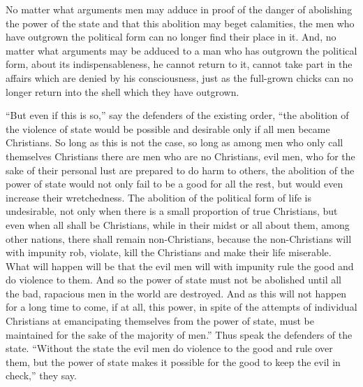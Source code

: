 \documentclass{book}
\begin{document}
No matter what arguments men may adduce in proof of the danger of abolishing the power of the state and that this abolition may beget calamities, the men who have outgrown the political form can no longer find their place in it. And, no matter what arguments may be adduced to a man who has outgrown the political form, about its indispensableness, he cannot return to it, cannot take part in the affairs which are denied by his consciousness, just as the full-grown chicks can no longer return into the shell which they have outgrown.

“But even if this is so,” say the defenders of the existing order, “the abolition of the violence of state would be possible and desirable only if all men became Christians. So long as this is not the case, so long as among men who only call themselves Christians there are men who are no Christians, evil men, who for the sake of their personal lust are prepared to do harm to others, the abolition of the power of state would not only fail to be a good for all the rest, but would even increase their wretchedness. The abolition of the political form of life is undesirable, not only when there is a small proportion of true Christians, but even when all shall be Christians, while in their midst or all about them, among other nations, there shall remain non-Christians, because the non-Christians will with impunity rob, violate, kill the Christians and make their life miserable. What will happen will be that the evil men will with impunity rule the good and do violence to them. And so the power of state must not be abolished until all the bad, rapacious men in the world are destroyed. And as this will not happen for a long time to come, if at all, this power, in spite of the attempts of individual Christians at emancipating themselves from the power of state, must be maintained for the sake of the majority of men.” Thus speak the defenders of the state. “Without the state the evil men do violence to the good and rule over them, but the power of state makes it possible for the good to keep the evil in check,” they say.
\end{document}
